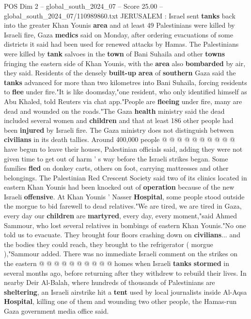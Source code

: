 \begin{textsample}{POS Dim 2 – global\_south\_2024\_07 – Score 25.00 – global\_south\_2024\_07/110989860.txt}  \label{ex:f2_pos_168}
JERUSALEM : Israel sent \textbf{tanks} back into the greater Khan Younis \textbf{area} and at least 49 Palestinians were killed by Israeli fire, Gaza \textbf{medics} said on Monday, after ordering evacuations of some districts it said had been used for renewed attacks by Hamas.
The Palestinians were killed by \textbf{tank} salvoes in the \textbf{town} of Bani Suhaila and other \textbf{towns} fringing the eastern side of Khan Younis, with the \textbf{area} also \textbf{bombarded} by air, they said.
Residents of the densely \textbf{built-up} \textbf{area} of \textbf{southern} Gaza said the \textbf{tanks} advanced for more than two kilometres into Bani Suhaila, forcing residents to \textbf{flee} under fire."It is like doomsday,"one resident, who only identified himself as Abu Khaled, told Reuters via chat app."People are \textbf{fleeing} under fire, many are dead and wounded on the roads."The Gaza \textbf{health} ministry said the dead included several women and \textbf{children} and that at least 186 other people had been \textbf{injured} by Israeli fire.
The Gaza ministry does not distinguish between \textbf{civilians} in its death tallies.
Around 400,000 people @ @ @ @ @ @ @ @ @ @ have begun to leave their houses, Palestinian officials said, adding they were not given time to get out of harm ' s way before the Israeli strikes began.
Some families \textbf{fled} on donkey carts, others on foot, carrying mattresses and other belongings.
The Palestinian Red Crescent Society said two of its clinics located in eastern Khan Younis had been knocked out of \textbf{operation} because of the new Israeli \textbf{offensive}.
At Khan Younis ' Nasser \textbf{Hospital}, some people stood outside the morgue to bid farewell to dead relatives."We are tired, we are tired in Gaza, every day our \textbf{children} are \textbf{martyred}, every day, every moment,"said Ahmed Sammour, who lost several relatives in bombings of eastern Khan Younis."No one told us to evacuate.
They brought four floors crashing down on \textbf{civilians}... and the bodies they could reach, they brought to the refrigerator ( morgue ),"Sammour added.
There was no immediate Israeli comment on the strikes on the eastern @ @ @ @ @ @ @ @ @ @ homes when Israeli \textbf{tanks} \textbf{stormed} in several months ago, before returning after they withdrew to rebuild their lives.
In nearby Deir Al-Balah, where hundreds of thousands of Palestinians are \textbf{sheltering}, an Israeli airstrike hit a \textbf{tent} used by local journalists inside Al-Aqsa \textbf{Hospital}, killing one of them and wounding two other people, the Hamas-run Gaza government media office said.

\end{textsample}
